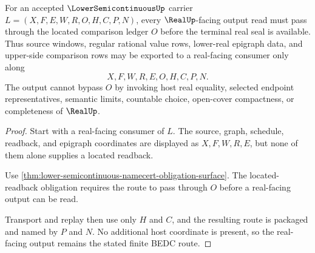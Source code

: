 \begin{theorem}
\label{thm:lowersemicontinuous-located-readback-compatibility}
For an accepted $\LowerSemicontinuousUp$ carrier
$L=(X,F,E,W,R,O,H,C,P,N)$, every $\RealUp$-facing output read must pass
through the located comparison ledger $O$ before the terminal real seal is
available. Thus source windows, regular rational value rows, lower-real
epigraph data, and upper-side comparison rows may be exported to a real-facing
consumer only along
$$
X,F,W,R,E,O,H,C,P,N .
$$
The output cannot bypass $O$ by invoking host real equality, selected endpoint
representatives, semantic limits, countable choice, open-cover compactness, or
completeness of $\RealUp$.
\end{theorem}
\begin{proof}
Start with a real-facing consumer of $L$. The source, graph, schedule,
readback, and epigraph coordinates are displayed as $X,F,W,R,E$, but none of
them alone supplies a located readback.

Use \autoref{thm:lower-semicontinuous-namecert-obligation-surface}. The
located-readback obligation requires the route to pass through $O$ before a
real-facing output can be read.

Transport and replay then use only $H$ and $C$, and the resulting route is
packaged and named by $P$ and $N$. No additional host coordinate is present,
so the real-facing output remains the stated finite BEDC route.
\end{proof}


